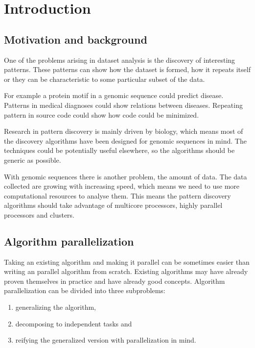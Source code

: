 \chapter{Introduction}
\label{c:introduction}

\section{Motivation and background}

One of the problems arising in dataset analysis is the discovery of interesting patterns. These patterns can show how the dataset is formed, how it repeats itself or they can be characteristic to some particular subset of the data.

For example a protein motif in a genomic sequence could predict disease. Patterns in medical diagnoses could show relations between diseases. Repeating pattern in source code could show how code could be minimized. 

Research in pattern discovery is mainly driven by biology, which means most of the discovery algorithms have been designed for genomic sequences in mind. The techniques could be potentially useful elsewhere, so the algorithms should be generic as possible.

With genomic sequences there is another problem, the amount of data\cite{HowIsGenomeDoing}. The data collected are growing with increasing speed, which means we need to use more computational resources to analyse them. This means the pattern discovery algorithms should take advantage of multicore processors, highly parallel processors and clusters.




\section{Algorithm parallelization}

Taking an existing algorithm and making it parallel can be sometimes easier than writing an parallel algorithm from scratch. Existing algorithms may have already proven themselves in practice and have already good concepts. Algorithm parallelization can be divided into three subproblems:

\begin{enumerate}
	\item generalizing the algorithm,
	\item decomposing to independent tasks and
	\item reifying the generalized version with parallelization in mind.
\end{enumerate}

